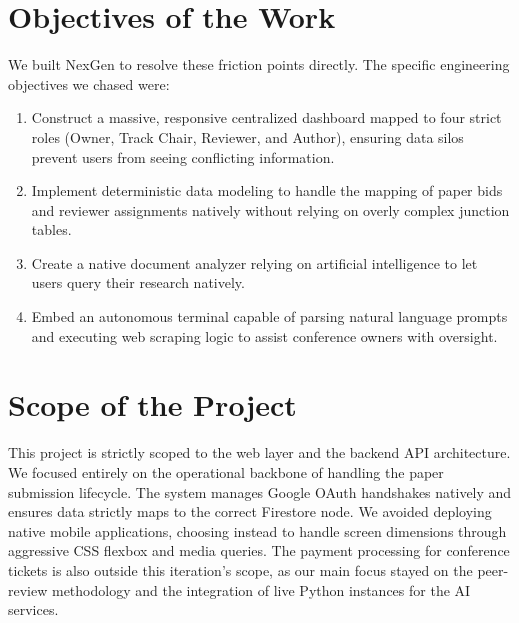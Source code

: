 \documentclass[12pt,a4paper]{report}
\begin{document}
\section{Objectives of the Work}
We built NexGen to resolve these friction points directly. The specific engineering objectives we chased were:
\begin{enumerate}
    \item Construct a massive, responsive centralized dashboard mapped to four strict roles (Owner, Track Chair, Reviewer, and Author), ensuring data silos prevent users from seeing conflicting information.
    \item Implement deterministic data modeling to handle the mapping of paper bids and reviewer assignments natively without relying on overly complex junction tables.
    \item Create a native document analyzer relying on artificial intelligence to let users query their research natively.
    \item Embed an autonomous terminal capable of parsing natural language prompts and executing web scraping logic to assist conference owners with oversight.
\end{enumerate}

\section{Scope of the Project}
This project is strictly scoped to the web layer and the backend API architecture. We focused entirely on the operational backbone of handling the paper submission lifecycle. The system manages Google OAuth handshakes natively and ensures data strictly maps to the correct Firestore node. We avoided deploying native mobile applications, choosing instead to handle screen dimensions through aggressive CSS flexbox and media queries. The payment processing for conference tickets is also outside this iteration’s scope, as our main focus stayed on the peer-review methodology and the integration of live Python instances for the AI services.
\end{document}
